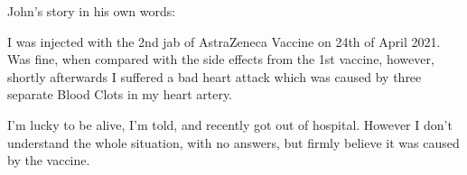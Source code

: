 John’s story in his own words:

I was injected with the 2nd jab of AstraZeneca Vaccine on 24th of April
2021. Was fine, when compared with the side effects from the 1st vaccine,
however, shortly afterwards I suffered a bad heart attack which was caused by
three separate Blood Clots in my heart artery.

I’m lucky to be alive, I’m told, and recently got out of hospital. However I
don’t understand the whole situation, with no answers, but firmly believe it was
caused by the vaccine.

